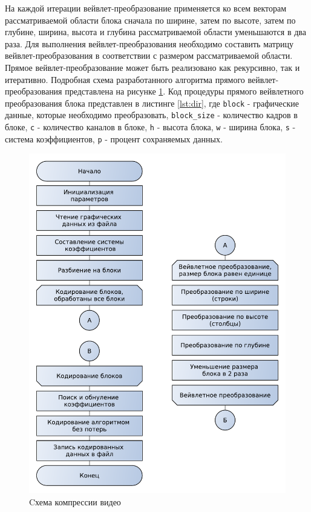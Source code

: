 На каждой итерации вейвлет-преобразование применяется ко всем векторам рассматриваемой области 
блока сначала по ширине, затем по высоте, затем по глубине, ширина, высота и глубина рассматриваемой области уменьшаются в два раза. 
Для выполнения вейвлет-преобразования необходимо составить матрицу вейвлет-преобразования в соответствии с 
размером рассматриваемой области. 
Прямое вейвлет-преобразование может быть реализовано как рекурсивно, так и итеративно. 
Подробная схема разработанного алгоритма прямого вейвлет-преобразования представлена на рисунке \ref{fig:figalgdir}. 
Код процедуры прямого вейвлетного преобразования блока представлен в листинге \ref{lst:dir}, где \texttt{block} - графические данные, которые необходимо преобразовать,
\texttt{block\_size} - количество кадров в блоке, \texttt{с} - количество каналов в блоке, \texttt{h} - высота блока, \texttt{w}
- ширина блока, \texttt{s} - система коэффициентов, \texttt{p} - процент 
сохраняемых данных.

\begin{figure}
  \centering
  \includegraphics[scale=0.75]{inc/graphics/alg1.pdf}
  \caption{Cхема компрессии видео}
  \label{fig:figalgdir}
\end{figure}

